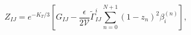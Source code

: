 \begin{equation}
\label{Kmetric}
Z_{IJ} = e^{-K_{T}/3} \left[ G_{IJ} - \frac{\epsilon}{2 \mathcal{V}}
\tilde{\Gamma}^{i}_{IJ} \sum_{n=0}^{N+1} (1 - z_{n})^{2} \beta_{i}^{(n)}
\right],
\end{equation}

